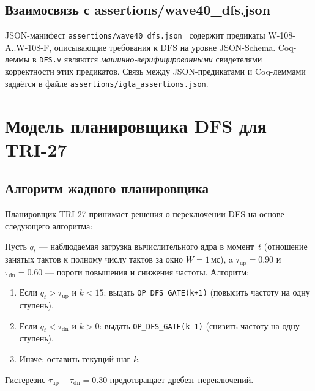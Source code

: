 \subsection{Взаимосвязь с assertions/wave40\_dfs.json}
\label{subsec:wave40-dfs-json}

JSON-манифест \texttt{assertions/wave40\_dfs.json}~\cite{trios886}
содержит предикаты W-108-A..W-108-F, описывающие требования к DFS
на уровне JSON-Schema.  Coq-леммы в \texttt{DFS.v} являются
\emph{машинно-верифицированными} свидетелями корректности этих предикатов.
Связь между JSON-предикатами и Coq-леммами задаётся в файле
\texttt{assertions/igla\_assertions.json}.

\section{Модель планировщика DFS для TRI-27}
\label{sec:glava86-scheduler}

\subsection{Алгоритм жадного планировщика}
\label{subsec:greedy-scheduler}

Планировщик TRI-27 принимает решения о переключении DFS
на основе следующего алгоритма:

\begin{definition}
\label{def:greedy-dfs-scheduler}
Пусть $q_t$ — наблюдаемая загрузка вычислительного ядра в момент~$t$
(отношение занятых тактов к полному числу тактов за окно $W = 1\,\text{мс}$),
a $\tau_{\mathrm{up}} = 0{.}90$ и $\tau_{\mathrm{dn}} = 0{.}60$ — пороги
повышения и снижения частоты.
Алгоритм:
\begin{enumerate}
  \item Если $q_t > \tau_{\mathrm{up}}$ и $k < 15$: выдать
        \texttt{OP\_DFS\_GATE(k+1)} (повысить частоту на одну ступень).
  \item Если $q_t < \tau_{\mathrm{dn}}$ и $k > 0$: выдать
        \texttt{OP\_DFS\_GATE(k-1)} (снизить частоту на одну ступень).
  \item Иначе: оставить текущий шаг $k$.
\end{enumerate}
Гистерезис $\tau_{\mathrm{up}} - \tau_{\mathrm{dn}} = 0{.}30$ предотвращает
дребезг переключений.
\end{definition}

